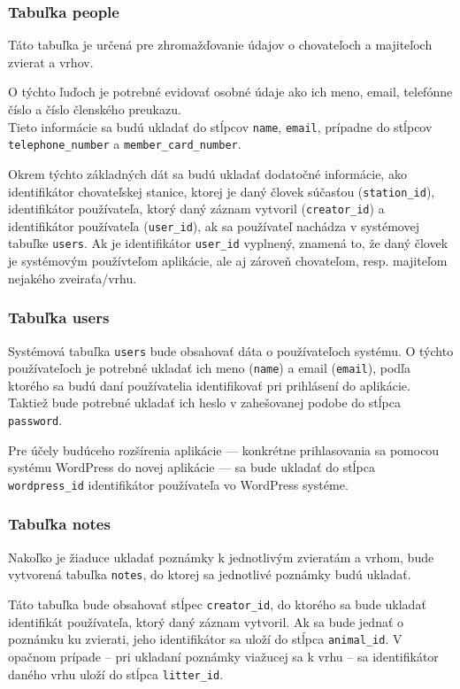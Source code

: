 \subsubsection*{Tabuľka people}
Táto tabuľka je určená pre zhromažďovanie údajov o chovateľoch a majiteľoch zvierat a vrhov.

O týchto ľuďoch je potrebné evidovať osobné údaje ako ich meno, email, telefónne číslo a číslo členského preukazu.
\\ Tieto informácie sa budú ukladať do stĺpcov \texttt{name}, \texttt{email}, prípadne do stĺpcov \texttt{telephone_number} a \texttt{member_card_number}.

Okrem týchto základných dát sa budú ukladať dodatočné informácie, ako identifikátor chovateľskej stanice, ktorej je daný človek súčasťou (\texttt{station_id}), identifikátor používateľa, ktorý daný záznam vytvoril (\texttt{creator_id}) a identifikátor používateľa (\texttt{user_id}), ak sa používateľ nachádza v systémovej tabuľke \texttt{users}. Ak je identifikátor \texttt{user_id} vyplnený, znamená to, že daný človek je systémovým používteľom aplikácie, ale aj zároveň chovateľom, resp. majiteľom nejakého zveiraťa/vrhu.

\subsubsection*{Tabuľka users}
Systémová tabuľka \texttt{users} bude obsahovať dáta o používateľoch systému. O týchto používateľoch je potrebné ukladať ich meno (\texttt{name}) a email (\texttt{email}), podľa ktorého sa budú daní používatelia identifikovať pri prihlásení do aplikácie. Taktiež bude potrebné ukladať ich heslo v zahešovanej podobe do stĺpca \texttt{password}.

Pre účely budúceho rozšírenia aplikácie --- konkrétne prihlasovania sa pomocou systému WordPress do novej aplikácie --- sa bude ukladať do stĺpca \texttt{wordpress_id} identifikátor používateľa vo WordPress systéme.

\subsubsection*{Tabuľka notes}
Nakoľko je žiaduce ukladať poznámky k jednotlivým zvieratám a vrhom, bude vytvorená tabuľka \texttt{notes}, do ktorej sa jednotlivé poznámky budú ukladať.

Táto tabuľka bude obsahovať stĺpec \texttt{creator_id}, do ktorého sa bude ukladať identifikát používateľa, ktorý daný záznam vytvoril. Ak sa bude jednať o poznámku ku zvierati, jeho identifikátor sa uloží do stĺpca \texttt{animal_id}. V opačnom prípade -- pri ukladaní poznámky viažucej sa k vrhu -- sa identifikátor daného vrhu uloží do stĺpca \texttt{litter_id}.

